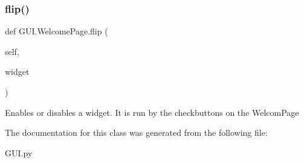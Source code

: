 \subsubsection{\texorpdfstring{flip()}{flip()}}
{\footnotesize\ttfamily def G\+U\+I.\+Welcome\+Page.\+flip (\begin{DoxyParamCaption}\item[{}]{self,  }\item[{}]{widget }\end{DoxyParamCaption})}

\begin{DoxyVerb}Enables or disables a widget. It is run by the checkbuttons on the WelcomPage
\end{DoxyVerb}
 

The documentation for this class was generated from the following file\+:\begin{DoxyCompactItemize}
\item 
G\+U\+I.\+py\end{DoxyCompactItemize}

